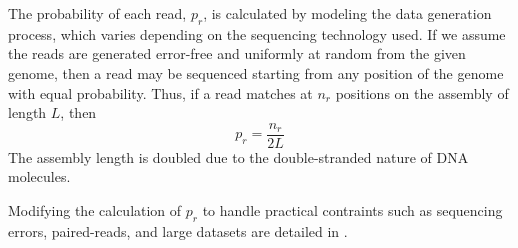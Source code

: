 The probability of each read, $p_r$, is calculated by modeling the data generation process, which varies depending on the sequencing technology used.
If we assume the reads are generated error-free and uniformly at random from the given genome, then a read may be sequenced starting from any position of the genome with equal probability.
Thus, if a read
matches at $n_r$ positions on the assembly of length $L$, then
\begin{equation}
  \label{error_free_probability}
  p_r = \frac{n_r}{2L}
\end{equation}
The assembly length is doubled due to the double-stranded nature of DNA molecules.

Modifying the calculation of $p_r$ to handle practical contraints such as sequencing errors, paired-reads, and large datasets are detailed in \cite{LAP}.




